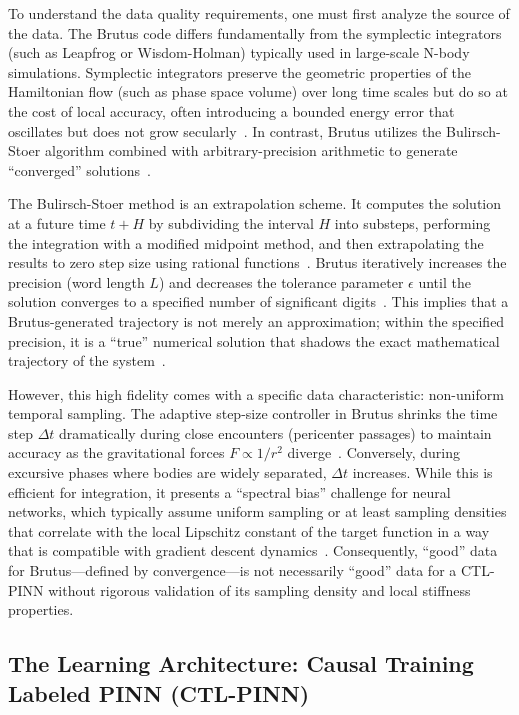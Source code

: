 \documentclass[11pt, a4paper]{article}
\begin{document}
To understand the data quality requirements, one must first analyze the source of the data. The Brutus code differs fundamentally from the symplectic integrators (such as Leapfrog or Wisdom-Holman) typically used in large-scale N-body simulations. Symplectic integrators preserve the geometric properties of the Hamiltonian flow (such as phase space volume) over long time scales but do so at the cost of local accuracy, often introducing a bounded energy error that oscillates but does not grow secularly~\cite{ref1}. In contrast, Brutus utilizes the Bulirsch-Stoer algorithm combined with arbitrary-precision arithmetic to generate ``converged'' solutions~\cite{ref3}.

The Bulirsch-Stoer method is an extrapolation scheme. It computes the solution at a future time $t + H$ by subdividing the interval $H$ into substeps, performing the integration with a modified midpoint method, and then extrapolating the results to zero step size using rational functions~\cite{ref3}. Brutus iteratively increases the precision (word length $L$) and decreases the tolerance parameter $\epsilon$ until the solution converges to a specified number of significant digits~\cite{ref3}. This implies that a Brutus-generated trajectory is not merely an approximation; within the specified precision, it is a ``true'' numerical solution that shadows the exact mathematical trajectory of the system~\cite{ref3}.

However, this high fidelity comes with a specific data characteristic: non-uniform temporal sampling. The adaptive step-size controller in Brutus shrinks the time step $\Delta t$ dramatically during close encounters (pericenter passages) to maintain accuracy as the gravitational forces $F \propto 1/r^2$ diverge~\cite{ref6}. Conversely, during excursive phases where bodies are widely separated, $\Delta t$ increases. While this is efficient for integration, it presents a ``spectral bias'' challenge for neural networks, which typically assume uniform sampling or at least sampling densities that correlate with the local Lipschitz constant of the target function in a way that is compatible with gradient descent dynamics~\cite{ref8}. Consequently, ``good'' data for Brutus—defined by convergence—is not necessarily ``good'' data for a CTL-PINN without rigorous validation of its sampling density and local stiffness properties.

\subsection{The Learning Architecture: Causal Training Labeled PINN (CTL-PINN)}
\end{document}
